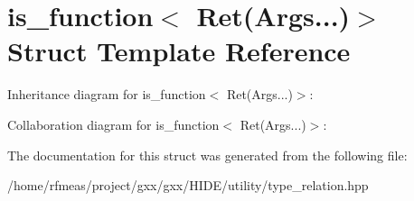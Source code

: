 \hypertarget{structis__function_3_01Ret_07Args_8_8_8_08_4}{}\section{is\+\_\+function$<$ Ret(Args...)$>$ Struct Template Reference}
\label{structis__function_3_01Ret_07Args_8_8_8_08_4}


Inheritance diagram for is\+\_\+function$<$ Ret(Args...)$>$\+:


Collaboration diagram for is\+\_\+function$<$ Ret(Args...)$>$\+:


The documentation for this struct was generated from the following file\+:\begin{DoxyCompactItemize}
\item 
/home/rfmeas/project/gxx/gxx/\+H\+I\+D\+E/utility/type\+\_\+relation.\+hpp\end{DoxyCompactItemize}
